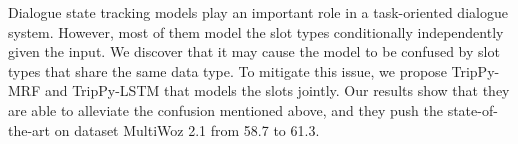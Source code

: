 Dialogue state tracking models play an important role in a task-oriented dialogue system. However, most of them model the slot types conditionally independently given the input. We discover that it may cause the model to be confused by slot types that share the same data type. To mitigate this issue, we propose TripPy-MRF and TripPy-LSTM that models the slots jointly. Our results show that they are able to alleviate the confusion mentioned above, and they push the state-of-the-art on dataset MultiWoz 2.1 from 58.7 to 61.3.
